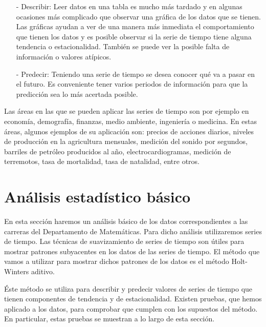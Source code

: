   \begin{itemize}
\item[-] Describir: Leer datos en una tabla es mucho más tardado y en algunas ocasiones más complicado que observar una gráfica de los datos que se tienen. Las gráficas ayudan a ver de una manera más inmediata el comportamiento que tienen los datos y es posible observar si la serie de tiempo tiene alguna tendencia o estacionalidad. También se puede ver la posible falta de información o valores atípicos.

\item[-] Predecir: Teniendo una serie de tiempo se desea conocer qué va a pasar en el futuro. Es conveniente tener varios periodos de información para que la predicción sea lo más acertada posible.
\end{itemize}

Las áreas en las que se pueden aplicar las series de tiempo son por ejemplo en economía, demografía, finanzas, medio ambiente, ingeniería o medicina. En estas áreas, algunos ejemplos de su aplicación son: precios de acciones diarios, niveles de producción en la agricultura mensuales, medición del sonido por segundos, barriles de petróleo producidos al año, electrocardiogramas, medición de terremotos, tasa de mortalidad, tasa de natalidad, entre otros.


\section{Análisis estadístico básico}

En esta sección haremos un análisis básico de los datos correspondientes a las carreras del Departamento de Matemáticas. Para dicho análisis utilizaremos series de tiempo. Las técnicas de suavizamiento de series de tiempo son útiles para mostrar patrones subyacentes en los datos de las series de tiempo. El método que vamos a utilizar para mostrar dichos patrones de los datos es el método Holt-Winters aditivo.


Éste método se utiliza para describir y predecir valores de series de tiempo que tienen componentes de tendencia y de estacionalidad. Existen pruebas, que hemos aplicado a los datos, para comprobar que cumplen con los supuestos del método. En particular, estas pruebas se muestran a lo largo de esta sección.

